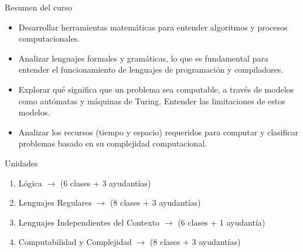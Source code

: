 \documentclass{beamer}
\begin{document}
\begin{frame}{Resumen del curso}
  \begin{itemize}[<+->]
    \item Desarrollar herramientas matemáticas para entender algoritmos y
          procesos computacionales.
    \item Analizar lenguajes formales y gramáticas, lo que es fundamental para
          entender el funcionamiento de lenguajes de programación y
          compiladores.
    \item Explorar qué significa que un problema sea computable, a través de
          modelos como autómatas y máquinas de Turing. Entender las
          limitaciones de estos modelos.
    \item Analizar los recursos (tiempo y espacio) requeridos para computar y
          clasificar problemas basado en su complejidad computacional.
  \end{itemize}
\end{frame}


\begin{frame}{Unidades}
  \begin{enumerate}[<+->]
    \item Lógica $\rightarrow$ (6 clases + 3 ayudantías)
    \item Lenguajes Regulares $\rightarrow$ (8 clases + 3 ayudantías)
    \item Lenguajes Independientes del Contexto $\rightarrow$ (6 clases +
          1 ayudantía)
    \item Computabilidad y Complejidad $\rightarrow$ (8 clases + 3 ayudantías)
  \end{enumerate}

\end{frame}
\end{document}
